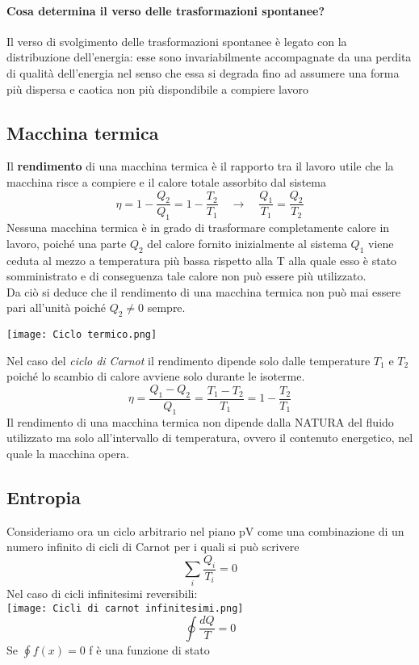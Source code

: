 \documentclass{article}
\newcommand{\so}{\quad \rightarrow \quad}
\begin{document}
\paragraph{Cosa determina il verso delle trasformazioni spontanee?} Il verso di svolgimento delle trasformazioni spontanee è legato con la distribuzione dell'energia: esse sono invariabilmente accompagnate da una perdita di qualità dell'energia nel senso che essa si degrada fino ad assumere una forma più dispersa e caotica non più dispondibile a compiere lavoro

\subsection{Macchina termica}

Il \textbf{rendimento} di una macchina termica è il rapporto tra il lavoro utile che la macchina risce a compiere e il calore totale assorbito dal sistema
\begin{equation*}
    \eta=1-\frac{Q_2}{Q_1}=1-\frac{T_2}{T_1} \so \frac{Q_1}{T_1}=\frac{Q_2}{T_2}
\end{equation*}
Nessuna macchina termica è in grado di trasformare completamente calore in lavoro, poiché una parte $Q_2$ del calore fornito inizialmente al sistema $Q_1$ viene ceduta al mezzo a temperatura più bassa rispetto alla T alla quale esso è stato somministrato e di conseguenza tale calore non può essere più utilizzato. \\
Da ciò si deduce che il rendimento di una macchina termica non può mai essere pari all'unità poiché $Q_2\neq0$ sempre.
\begin{center}
    \texttt{[image: Ciclo termico.png]}
\end{center}

Nel caso del \textit{ciclo di Carnot} il rendimento dipende solo dalle temperature $T_1$ e $T_2$ poiché lo scambio di calore avviene solo durante le isoterme.
\begin{equation*}
    \eta=\frac{Q_1-Q_2}{Q_1}=\frac{T_1-T_2}{T_1}=1-\frac{T_2}{T_1}
\end{equation*}
Il rendimento di una macchina termica non dipende dalla NATURA del fluido utilizzato ma solo all'intervallo di temperatura, ovvero il contenuto energetico, nel quale la macchina opera.


\subsection{Entropia}
Consideriamo ora un ciclo arbitrario nel piano pV come una combinazione di un numero infinito di cicli di Carnot per i quali si può scrivere
\begin{equation*}
    \sum_i\frac{Q_i}{T_i}=0
\end{equation*}
Nel caso di cicli infinitesimi reversibili:\\\texttt{[image: Cicli di carnot infinitesimi.png]}
\begin{equation*}
    \oint \frac{dQ}{T}=0
\end{equation*}
Se $\oint f(x)=0$ f è una funzione di stato
\end{document}
